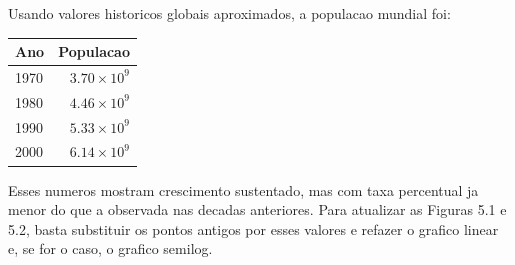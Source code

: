 Usando valores historicos globais aproximados, a populacao mundial foi:
\begin{center}
\begin{tabular}{lr}
\toprule
Ano & Populacao \\
\midrule
1970 & $3.70\times 10^9$ \\
1980 & $4.46\times 10^9$ \\
1990 & $5.33\times 10^9$ \\
2000 & $6.14\times 10^9$ \\
\bottomrule
\end{tabular}
\end{center}
Esses numeros mostram crescimento sustentado, mas com taxa percentual ja menor do que a observada nas decadas anteriores. Para atualizar as Figuras 5.1 e 5.2, basta substituir os pontos antigos por esses valores e refazer o grafico linear e, se for o caso, o grafico semilog.

